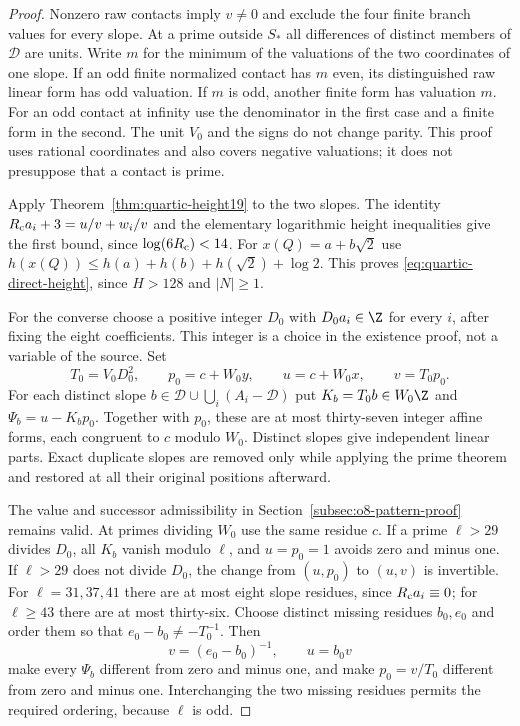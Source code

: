 \begin{proof}
Nonzero raw contacts imply $v\ne0$ and exclude the four finite branch
values for every slope. At a prime outside $S_*$ all differences of
distinct members of $\mathcal D$ are units. Write $m$ for the minimum
of the valuations of the two coordinates of one slope. If an odd finite
normalized contact has $m$ even, its distinguished raw linear form has
odd valuation. If $m$ is odd, another finite form has valuation $m$.
For an odd contact at infinity use the denominator in the first case
and a finite form in the second. The unit $V_0$ and the signs do not
change parity. This proof uses rational coordinates and also covers
negative valuations; it does not presuppose that a contact is prime.

Apply Theorem~\ref{thm:quartic-height19} to the two slopes. The identity
$R_{\rm c}a_i+3=u/v+w_i/v$ and the elementary logarithmic height inequalities
give the first bound, since $\log(6R_{\rm c})<14$. For
$x(Q)=a+b\sqrt2$ use
$h(x(Q))\le h(a)+h(b)+h(\sqrt2)+\log2$.
This proves \eqref{eq:quartic-direct-height}, since $H>128$ and $|N|\ge1$.

For the converse choose a positive integer $D_0$ with $D_0a_i\in\Z$
for every $i$, after fixing the eight coefficients. This integer is a
choice in the existence proof, not a variable of the source. Set
\[
 T_0=V_0D_0^2,\qquad p_0=c+W_0y,\qquad
 u=c+W_0x,\qquad v=T_0p_0.
\]
For each distinct slope
$b\in\mathcal D\cup\bigcup_i(A_i-\mathcal D)$ put
$K_b=T_0b\in W_0\Z$ and $\Psi_b=u-K_bp_0$.
Together with $p_0$, these are at most thirty-seven integer affine forms,
each congruent to $c$ modulo $W_0$. Distinct slopes give independent
linear parts. Exact duplicate slopes are removed only while applying
the prime theorem and restored at all their original positions afterward.

The value and successor admissibility in
Section~\ref{subsec:o8-pattern-proof} remains valid. At primes dividing
$W_0$ use the same residue $c$. If a prime $\ell>29$ divides $D_0$,
all $K_b$ vanish modulo $\ell$, and $u=p_0=1$ avoids zero and minus one.
If $\ell>29$ does not divide $D_0$, the change from $(u,p_0)$ to $(u,v)$
is invertible. For $\ell=31,37,41$ there are at most eight slope residues,
since $R_{\rm c}a_i\equiv0$; for $\ell\ge43$ there are at most thirty-six.
Choose distinct missing residues $b_0,e_0$ and order them so that
$e_0-b_0\ne-T_0^{-1}$. Then
\[
 v=(e_0-b_0)^{-1},\qquad u=b_0v
\]
make every $\Psi_b$ different from zero and minus one, and make
$p_0=v/T_0$ different from zero and minus one. Interchanging the two
missing residues permits the required ordering, because $\ell$ is odd.


\end{proof}
